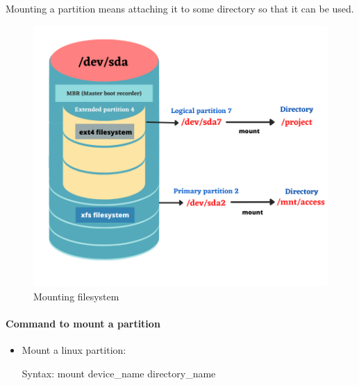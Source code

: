 \setlength{\columnsep}{3pt}
\begin{flushleft}
	

	Mounting a partition means attaching it to some directory so that it can be used. 
		
		\begin{figure}[h!]
			\centering
			\includegraphics[scale=.6]{content/chapter8/images/new.png}
			\caption{Mounting filesystem}
			\label{mounting}
		\end{figure}	
	
	\newpage
	\paragraph{Command to mount a partition}
		\begin{itemize}		
		\item Mount a linux partition:
		\begin{tcolorbox}[breakable,notitle,boxrule=-0pt,colback=pink,colframe=pink]
			\color{black}
			\font=9pt
			Syntax: mount device\_name directory\_name
			\font=4pt
		\end{tcolorbox}
		

\end{itemize}
\end{flushleft}
